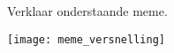 \documentclass{ximera}
\begin{document}
\begin{exercise}
Verklaar onderstaande meme. 

\begin{image}
\texttt{[image: meme\_versnelling]}
\end{image}

\end{exercise}
	
\end{document}
